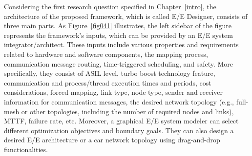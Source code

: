     Considering the first research question specified in Chapter~\ref{intro}, the architecture of the proposed framework, which is called E/E Designer, consists of three main parts. As Figure~\ref{fig041} illustrates, the left sidebar of the figure represents the framework's inputs, which can be provided by an E/E system integrator/architect. These inputs include various properties and requirements related to hardware and software components, the mapping process, communication message routing, time-triggered scheduling, and safety. More specifically, they consist of ASIL level, turbo boost technology feature, communication and process/thread execution times and periods, cost considerations, forced mapping, link type, node type, sender and receiver information for communication messages, the desired network topology (e.g., full-mesh or other topologies, including the number of required nodes and links), MTTF, failure rate, etc. Moreover, a graphical E/E system modeler can select different optimization objectives and boundary goals. They can also design a desired E/E architecture or a car network topology using drag-and-drop functionalities. %


